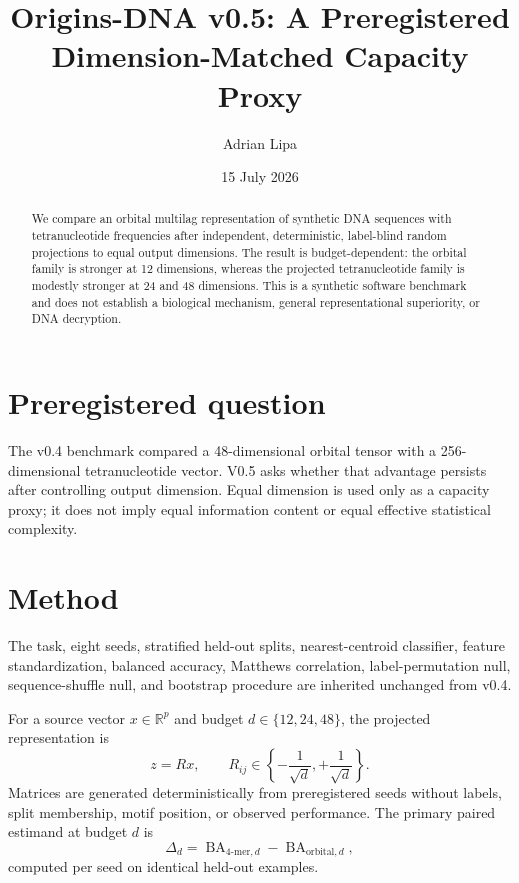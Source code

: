\documentclass[11pt]{article}
\title{Origins-DNA v0.5: A Preregistered Dimension-Matched Capacity Proxy}
\author{Adrian Lipa}
\date{15 July 2026}
\begin{document}
\maketitle

\begin{abstract}
We compare an orbital multilag representation of synthetic DNA sequences with tetranucleotide frequencies after independent, deterministic, label-blind random projections to equal output dimensions. The result is budget-dependent: the orbital family is stronger at 12 dimensions, whereas the projected tetranucleotide family is modestly stronger at 24 and 48 dimensions. This is a synthetic software benchmark and does not establish a biological mechanism, general representational superiority, or DNA decryption.
\end{abstract}

\section{Preregistered question}
The v0.4 benchmark compared a 48-dimensional orbital tensor with a 256-dimensional tetranucleotide vector. V0.5 asks whether that advantage persists after controlling output dimension. Equal dimension is used only as a capacity proxy; it does not imply equal information content or equal effective statistical complexity.

\section{Method}
The task, eight seeds, stratified held-out splits, nearest-centroid classifier, feature standardization, balanced accuracy, Matthews correlation, label-permutation null, sequence-shuffle null, and bootstrap procedure are inherited unchanged from v0.4.

For a source vector $x\in\mathbb{R}^{p}$ and budget $d\in\{12,24,48\}$, the projected representation is
\begin{equation}
 z = R x, \qquad R_{ij}\in\left\{-\frac{1}{\sqrt d},+\frac{1}{\sqrt d}\right\}.
 \label{eq:projection}
\end{equation}
Matrices are generated deterministically from preregistered seeds without labels, split membership, motif position, or observed performance. The primary paired estimand at budget $d$ is
\begin{equation}
 \Delta_d = \operatorname{BA}_{4\text{-mer},d}-\operatorname{BA}_{\mathrm{orbital},d},
 \label{eq:estimand}
\end{equation}
computed per seed on identical held-out examples.
\end{document}
